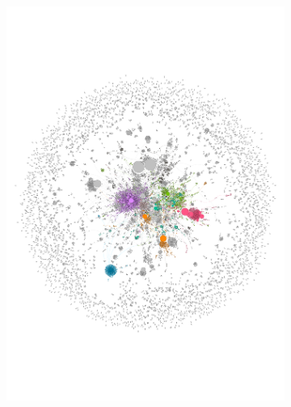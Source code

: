 \documentclass[
  a4paper,
  abstract=on,
  captions=tableabove
  ]{scrartcl}
\begin{document}
\begin{figure}
\begin{subfigure}{.45\linewidth}
          \label{subfig:net_last_cases_hyperlocal}
          \includegraphics[width=\linewidth, height=\textheight, keepaspectratio]{img/net_hyperlocal_four.pdf}
        \end{subfigure}


\end{figure}
\end{document}
